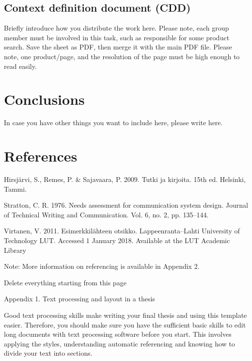 \documentclass{article}
\begin{document}
\bigskip

\subsection{Context definition document (CDD)}
Briefly introduce how you distribute the work here. Please note, each group member must be involved in this task, such
as responsible for some product search. Save the sheet as PDF, then merge it with the main PDF file. Please note, one
product/page, and the resolution of the page must be high enough to read easily.

\clearpage\section{Conclusions}
In case you have other things you want to include here, please write here.


\bigskip

\clearpage\section{References}

\bigskip


\bigskip

Hirsjärvi, S., Remes, P. \& Sajavaara, P. 2009. Tutki ja kirjoita. 15th ed. Helsinki, Tammi.

Stratton, C. R. 1976. Needs assessment for communication system design. Journal of Technical Writing and Communication.
Vol. 6, no. 2, pp. 135–144.

Virtanen, V. 2011. Esimerkkilähteen otsikko. Lappeenranta–Lahti University of Technology LUT. Accessed 1 January 2018.
Available at the LUT Academic Library


\bigskip

Note: More information on referencing is available in Appendix 2.

\clearpage

Delete everything starting from this page

Appendix 1. Text processing and layout in a thesis 

Good text processing skills make writing your final thesis and using this template easier. Therefore, you should make
sure you have the sufficient basic skills to edit long documents with text processing software before you start. This
involves applying the styles, understanding automatic referencing and knowing how to divide your text into sections. 
\end{document}

